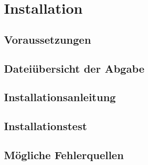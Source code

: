 \chapter{Installation}\label{chap:installation}


\section{Voraussetzungen}\label{sec:voraussetzungen}


\section{Dateiübersicht der Abgabe}\label{sec:dateiuebersicht-der-abgabe}


\section{Installationsanleitung}\label{sec:installationsanleitung}


\section{Installationstest}\label{sec:installationstest}


\section{Mögliche Fehlerquellen}\label{sec:moegliche-fehlerquellen}

